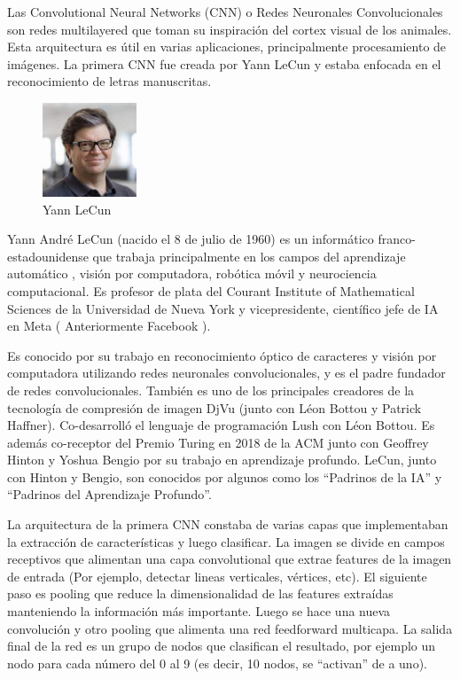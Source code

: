 \documentclass[a4paper]{article}
\begin{document}
Las Convolutional Neural Networks (CNN) o Redes Neuronales Convolucionales 
son redes multilayered que toman 
su inspiración del cortex visual de los animales. Esta 
arquitectura es útil en varias aplicaciones, principalmente 
procesamiento de imágenes. La primera CNN fue creada por Yann 
LeCun y estaba enfocada en el reconocimiento de letras 
manuscritas.

\begin{figure} %
    \centering
    \includegraphics[width=0.25\textwidth]{./images/Yann_LeCun.jpeg}
    \caption{Yann LeCun}
\end{figure}

Yann André LeCun (nacido el 8 de julio de 1960) es un informático 
franco-estadounidense que trabaja principalmente en los campos del 
aprendizaje automático , visión por computadora, robótica móvil y 
neurociencia computacional. Es profesor de plata del Courant 
Institute of Mathematical Sciences de la Universidad de Nueva York 
y vicepresidente, científico jefe de IA en Meta ( Anteriormente 
Facebook ).

Es conocido por su trabajo en reconocimiento óptico de caracteres 
y visión por computadora utilizando redes neuronales 
convolucionales, y es el padre fundador de redes 
convolucionales. También es uno de los principales creadores de la 
tecnología de compresión de imagen DjVu (junto con Léon Bottou y 
Patrick Haffner). Co-desarrolló el lenguaje de programación Lush 
con Léon Bottou. Es además co-receptor del Premio Turing en 2018 de la ACM junto con 
Geoffrey Hinton y Yoshua Bengio por su trabajo en aprendizaje 
profundo. LeCun, junto con Hinton y Bengio, son conocidos por algunos como 
los ``Padrinos de la IA'' y ``Padrinos del Aprendizaje Profundo''. 

La arquitectura de la primera CNN constaba de varias capas que 
implementaban la extracción de características y luego clasificar. 
La imagen se divide en campos receptivos que alimentan una capa 
convolutional que extrae features de la imagen de entrada (Por 
ejemplo, detectar lineas verticales, vértices, etc). El siguiente 
paso es pooling que reduce la dimensionalidad de las features 
extraídas manteniendo la información más importante. Luego se hace 
una nueva convolución y otro pooling que alimenta una red 
feedforward multicapa. La salida final de la red es un grupo de 
nodos que clasifican el resultado, por ejemplo un nodo para cada 
número del 0 al 9 (es decir, 10 nodos, se ``activan'' de a uno).
\end{document}
